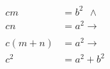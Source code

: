 \documentclass[preview]{standalone}
\begin{document}
\centering 
        \begin{math}
        \begin{aligned}
        cm &= b^2 \ \ \wedge \\
        cn &= a^2 \to \\
        \\
        c(m + n) &= a^2 \to \\
        c^2 &= a^2 + b^2
        \end{aligned}
        \end{math}
\end{document}
